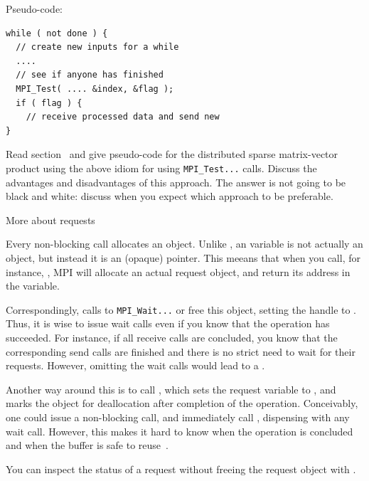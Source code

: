 Pseudo-code:
\begin{lstlisting}
while ( not done ) {
  // create new inputs for a while
  ....
  // see if anyone has finished
  MPI_Test( .... &index, &flag );
  if ( flag ) {
    // receive processed data and send new
}
\end{lstlisting}


\begin{exercise}
  Read section~ and give pseudo-code for the
    distributed sparse matrix-vector product using the above idiom for
    using \lstinline{MPI_Test...} calls. Discuss the advantages and
    disadvantages of this approach. The answer is not going to be
    black and white: discuss when you expect which approach to be
    preferable.
\end{exercise}

 {More about requests}
\label{ref:mpirequest}

Every non-blocking call allocates an 
object.
Unlike ,
an  variable is not actually an object,
but instead it is an (opaque) pointer.
This meeans that when you call, for instance, ,
MPI will allocate an actual request object, and return its
address in the  variable.

Correspondingly, calls to \lstinline{MPI_Wait...} or 
free this object,
setting the handle to .
Thus, it is wise to issue wait calls even
if you know that the operation has succeeded. For instance, if all
receive calls are concluded, you know that the corresponding send
calls are finished and there is no strict need to wait for their
requests. However, omitting the wait calls would lead to a
.

Another way around this is to call ,
which sets the request variable to ,
and marks the object for deallocation after completion of the
operation. Conceivably, one could issue a non-blocking call,
and immediately call , dispensing
with any wait call. However, this makes it hard to know when the operation
is concluded and when the buffer is safe to reuse~\cite{Squyres:evilrequest}.

You can inspect the status of a request without freeing the request object
with .




